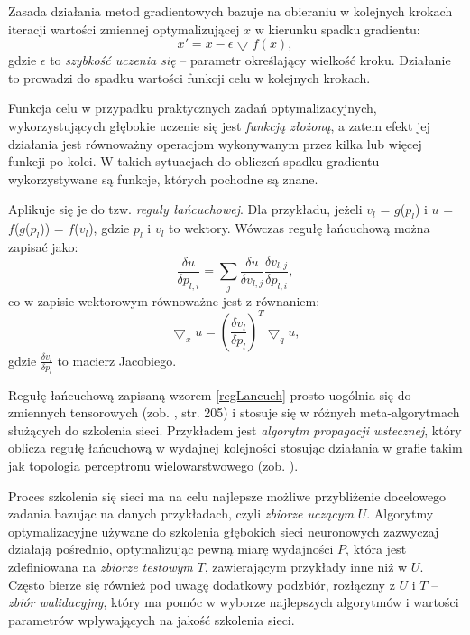 Zasada działania metod gradientowych bazuje na obieraniu w kolejnych krokach iteracji wartości zmiennej optymalizującej $x$ w kierunku spadku gradientu:
\begin{equation}
x' = x - \epsilon \bigtriangledown f(x),
\end{equation} 
gdzie $\epsilon$ to \textit{szybkość uczenia się} -- parametr określający wielkość kroku. Działanie to prowadzi do spadku wartości funkcji celu w kolejnych krokach. 

Funkcja celu w przypadku praktycznych zadań optymalizacyjnych, wykorzystujących głębokie uczenie się jest \textit{funkcją złożoną}, a zatem efekt jej działania jest równoważny operacjom wykonywanym przez kilka lub więcej funkcji po kolei. \linebreak W takich sytuacjach do obliczeń spadku gradientu wykorzystywane są funkcje, których pochodne są znane.

Aplikuje się je do tzw. \textit{reguły łańcuchowej}. Dla przykładu, jeżeli $v_l$ = $g$($p_l$) i $u$ = $f$($g$($p_l$)) = $f$($v_l$), gdzie $p_l$ i $v_l$ to wektory. Wówczas regułę łańcuchową można zapisać jako:
\begin{equation}
\frac{\delta u}{\delta p_{l,i}} = \sum_{j} \frac{\delta u}{\delta v_{l,j}} \frac{\delta v_{l,j}}{\delta p_{l,i}}, 
\end{equation}
co w zapisie wektorowym równoważne jest z równaniem:
\begin{equation}
\label{regLancuch}
\bigtriangledown_x u = \left(\frac{\delta v_l}{\delta p_l}\right)^T \bigtriangledown_q u, 
\end{equation}
gdzie $\frac{\delta v_l}{\delta p_l}$ to macierz Jacobiego. 

Regułę łańcuchową zapisaną wzorem \ref{regLancuch} prosto uogólnia się do zmiennych tensorowych (zob. \cite{Goodfellow-et-al-2016}, str. 205) i stosuje się w różnych meta-algorytmach służących \linebreak do szkolenia sieci. Przykładem jest \textit{algorytm propagacji wstecznej}, który oblicza regułę łańcuchową w wydajnej kolejności stosując działania w grafie takim jak topologia perceptronu wielowarstwowego (zob. \cite{Goodfellow-et-al-2016}).

Proces szkolenia się sieci ma na celu najlepsze możliwe przybliżenie docelowego zadania bazując na danych przykładach, czyli \textit{zbiorze uczącym} $U$. Algorytmy optymalizacyjne używane do szkolenia głębokich sieci neuronowych zazwyczaj działają pośrednio, optymalizując pewną miarę wydajności $P$, która jest zdefiniowana na \textit{zbiorze testowym} $T$, zawierającym przykłady inne niż w $U$. Często bierze się również pod uwagę dodatkowy podzbiór, rozłączny z $U$ i $T$ -- \textit{zbiór walidacyjny}, który ma pomóc w wyborze najlepszych algorytmów i wartości parametrów wpływających na jakość szkolenia sieci.

